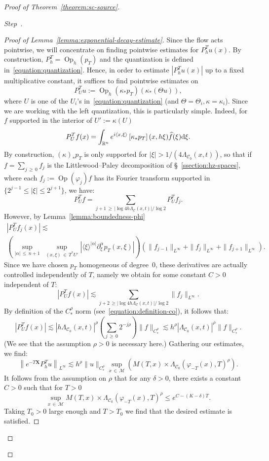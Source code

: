 \documentclass[10pt]{amsart}
\theoremstyle{definition}\newtheorem{defi}[theo]{Definition}\newtheorem{rema}[theo]{Remark}\newtheorem{exam}[theo]{Example}\newtheorem{exem}[theo]{Example}\newtheorem{nota}[theo]{Notation}
\newcommand{\R}{\mathbb{R}}
\newcommand{\X}{\mathbf{X}}
\newcommand{\M}{\mathcal{M}}
\newcommand{\clC}{\mathcal{C}}
\newcommand{\dd}{\mathrm{d}}
\DeclareMathOperator{\Op}{Op}
\newcounter{stepcount}
\newenvironment{step}{\refstepcounter{stepcount}\begin{proof}[Step~\thestepcount]}{\let\qed\relax\end{proof}}
\let\oldhat\hat
\renewcommand*{\hat}[1]{\mathchoice{\widehat{#1}}{\widehat{#1}}{\oldhat{#1}}{\oldhat{#1}}}
\begin{document}
\begin{proof}[Proof of Theorem~\ref{theorem:sc-source}]
\begin{step}
\begin{proof}[Proof of Lemma~\ref{lemma:exponential-decay-estimate}]
Since the flow acts pointwise, we will concentrate on finding pointwise estimates for $P^T_h u (x)$. By construction, $P^T_h = \Op_h(p_T)$ and the quantization is defined in~\eqref{equation:quantization}. Hence, in order to estimate $|P^T_h u(x)|$ up to a fixed multiplicative constant, it suffices to find pointwise estimates on
\[
P_U^T u := \Op_h(\kappa_* p_T) \left(\kappa_*(\Theta u)\right),
\]
where $U$ is one of the $U_i$'s in~\eqref{equation:quantization} (and $\Theta = \Theta_i, \kappa=\kappa_i$). Since we are working with the left quantization, this is particularly simple. Indeed, for $f$ supported in the interior of $U' := \kappa(U)$
\[
P_U^T f(x) = \int_{\R^n} e^{i \langle x, \xi\rangle} \left[\kappa_\ast p_T \right](x,h\xi)\hat{ f }(\xi) \dd \xi.
\]
By construction, $(\kappa)_\ast p_T$ is only supported for $|\xi| > 1/(4\Lambda_{\clC_0}(x,t))$, so that if $f = \sum_{j\,\geq\,0} f_j$ is the Littlewood--Paley decomposition of \S~\ref{ssection:hz-spaces}, where each $f_j := \Op(\varphi_j)f$ has its Fourier transform supported in $\{2^{j-1} \leq |\xi| \leq 2^{j+1}\}$, we have:
\[
P_U^T f = \sum_{j + 1\,\geq\,\left|\log 4 h \Lambda_{\clC}(x,t)\right| / \log 2 } P^T_U f_j.
\]
However, by Lemma~\ref{lemma:boundedness-phi}
\begin{multline*}
\left| P_U^T f_j(x)\right| \lesssim \\
\left(\sup_{|\alpha|\,\leq\,n+1 }\; \sup_{(x,\xi)\,\in\,T^*U'}\left| \langle\xi\rangle^{|\alpha|}\partial_\xi^\alpha p_T(x, \xi)\right|\right) \left(\| f_{j-1} \|_{L^\infty} + \| f_j \|_{L^\infty} + \| f_{j+1} \|_{L^\infty}\right).
\end{multline*}
Since we have chosen $p_T$ homogeneous of degree~$0$, these derivatives are actually controlled independently of $T$, namely we obtain for some constant $C >0$ independent of $T$:
\[
\left|P_U^T f(x)\right| \lesssim \sum_{j + 2\,\geq\left|\log 4 h \Lambda_{\clC}(x,t)\right| / \log 2 } \|f_j\|_{L^\infty}.
\]
By definition of the $C^\rho_\ast$ norm (see~\eqref{equation:definition-co}), it follows that:
\[
\left|P_U^T f(x)\right| \lesssim \left| h \Lambda_{\clC_0}(x,t) \right|^{\rho} \left(\sum_{j\,\geq\,0} 2^{-j\rho}\right) \|f\|_{C^\rho_\ast} \lesssim h^\rho |\Lambda_{\clC_0}(x,t)|^{\rho} \|f\|_{C^\rho_\ast}.
\]
(We see that the assumption $\rho>0$ is necessary here.) Gathering our estimates, we find:
\[
\left\| e^{-T \X} P^T_h u \right\|_{L^\infty} \lesssim h^\rho \| u \|_{C^\rho_\ast} \sup_{x \,\in\,\M} \left(M(T,x) \times \Lambda_{\clC_0}(\varphi_{-T}(x),T)^\rho \right).
\]
It follows from the assumption on $\rho$ that for any $\delta>0$, there exists a constant $C>0$ such that for $T>0$
\[
\sup_{x\,\in\,\M} M(T,x) \times \Lambda_{\clC_0}(\varphi_{-T}(x),T)^\rho \leq e^{C-(K-\delta) T}.
\]
Taking $T_0>0$ large enough and $T>T_0$ we find that the desired estimate is satisfied.
\end{proof}
\end{step}



\end{proof}
\end{document}
